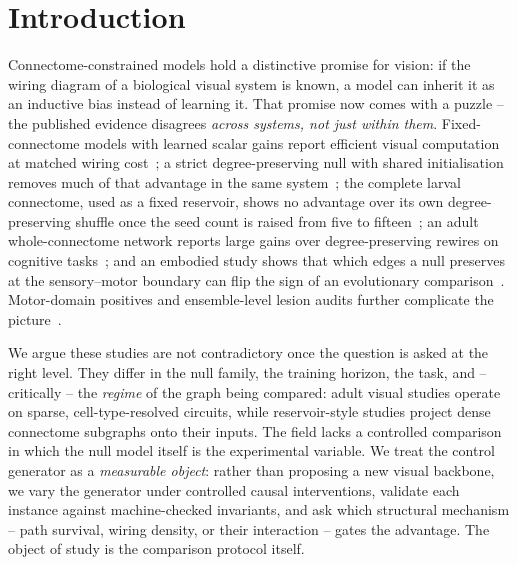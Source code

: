 \documentclass[10pt,twocolumn,letterpaper]{article}
\begin{document}
\section{Introduction}
\label{sec:intro}

Connectome-constrained models hold a distinctive promise for vision: if the
wiring diagram of a biological visual system is known, a model can inherit it
as an inductive bias instead of learning it. That promise now comes with a
puzzle -- the published evidence disagrees \emph{across systems, not just
within them}. Fixed-connectome models with learned scalar gains report
efficient visual computation at matched wiring cost~\cite{structurealone2026};
a strict degree-preserving null with shared initialisation removes much of
that advantage in the same system~\cite{toposens2026}; the complete larval
connectome, used as a fixed reservoir, shows no advantage over its own
degree-preserving shuffle once the seed count is raised from five to
fifteen~\cite{larvanull2026}; an adult whole-connectome network reports large
gains over degree-preserving rewires on cognitive tasks~\cite{cho2026whole};
and an embodied study shows that which edges a null preserves at the
sensory--motor boundary can flip the sign of an evolutionary
comparison~\cite{park2026nullboundary}. Motor-domain positives and
ensemble-level lesion audits further complicate the
picture~\cite{flygm2026,flyhack2026}.

We argue these studies are not contradictory once the question is asked at
the right level. They differ in the null family, the training horizon, the
task, and -- critically -- the \emph{regime} of the graph being compared:
adult visual studies operate on sparse, cell-type-resolved circuits, while
reservoir-style studies project dense connectome subgraphs onto their inputs.
The field lacks a controlled comparison in which the null model itself is the
experimental variable. We treat the control generator as a
\emph{measurable object}: rather than proposing a new visual backbone, we
vary the generator under controlled causal interventions, validate each
instance against machine-checked invariants, and ask which structural
mechanism -- path survival, wiring density, or their interaction -- gates the
advantage. The object of study is the comparison protocol itself.
\end{document}
